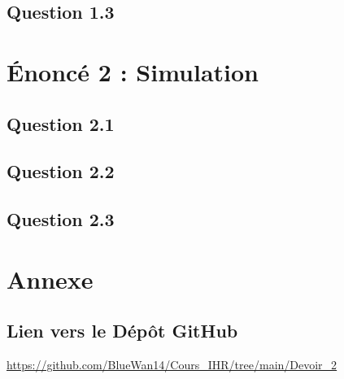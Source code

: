 \documentclass[a4paper,11pt]{article}
\begin{document}
\subsection{Question 1.3}

\section{Énoncé 2 : Simulation}
\subsection{Question 2.1}

\subsection{Question 2.2}

\subsection{Question 2.3}

\section{Annexe}
\subsection{Lien vers le Dépôt GitHub}
\url{https://github.com/BlueWan14/Cours_IHR/tree/main/Devoir_2}
\end{document}
